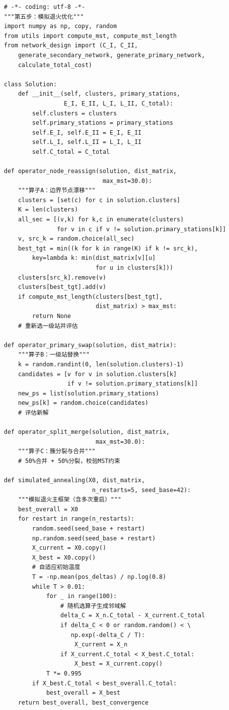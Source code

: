 \documentclass[12pt,a4paper]{ctexart}
\theoremstyle{definition}
\theoremstyle{plain}
\theoremstyle{remark}
\begin{document}
\begin{lstlisting}[caption={\texttt{optimization.py}：模拟退火与邻域搜索}]
# -*- coding: utf-8 -*-
"""第五步：模拟退火优化"""
import numpy as np, copy, random
from utils import compute_mst, compute_mst_length
from network_design import (C_I, C_II,
    generate_secondary_network, generate_primary_network,
    calculate_total_cost)

class Solution:
    def __init__(self, clusters, primary_stations,
                 E_I, E_II, L_I, L_II, C_total):
        self.clusters = clusters
        self.primary_stations = primary_stations
        self.E_I, self.E_II = E_I, E_II
        self.L_I, self.L_II = L_I, L_II
        self.C_total = C_total

def operator_node_reassign(solution, dist_matrix,
                            max_mst=30.0):
    """算子A：边界节点漂移"""
    clusters = [set(c) for c in solution.clusters]
    K = len(clusters)
    all_sec = [(v,k) for k,c in enumerate(clusters)
               for v in c if v != solution.primary_stations[k]]
    v, src_k = random.choice(all_sec)
    best_tgt = min((k for k in range(K) if k != src_k),
        key=lambda k: min(dist_matrix[v][u]
                          for u in clusters[k]))
    clusters[src_k].remove(v)
    clusters[best_tgt].add(v)
    if compute_mst_length(clusters[best_tgt],
                          dist_matrix) > max_mst:
        return None
    # 重新选一级站并评估

def operator_primary_swap(solution, dist_matrix):
    """算子B：一级站替换"""
    k = random.randint(0, len(solution.clusters)-1)
    candidates = [v for v in solution.clusters[k]
                  if v != solution.primary_stations[k]]
    new_ps = list(solution.primary_stations)
    new_ps[k] = random.choice(candidates)
    # 评估新解

def operator_split_merge(solution, dist_matrix,
                          max_mst=30.0):
    """算子C：簇分裂与合并"""
    # 50%合并 + 50%分裂，校验MST约束

def simulated_annealing(X0, dist_matrix,
                         n_restarts=5, seed_base=42):
    """模拟退火主框架（含多次重启）"""
    best_overall = X0
    for restart in range(n_restarts):
        random.seed(seed_base + restart)
        np.random.seed(seed_base + restart)
        X_current = X0.copy()
        X_best = X0.copy()
        # 自适应初始温度
        T = -np.mean(pos_deltas) / np.log(0.8)
        while T > 0.01:
            for _ in range(100):
                # 随机选算子生成邻域解
                delta_C = X_n.C_total - X_current.C_total
                if delta_C < 0 or random.random() < \
                   np.exp(-delta_C / T):
                    X_current = X_n
                if X_current.C_total < X_best.C_total:
                    X_best = X_current.copy()
            T *= 0.995
        if X_best.C_total < best_overall.C_total:
            best_overall = X_best
    return best_overall, best_convergence
\end{lstlisting}
\end{document}
